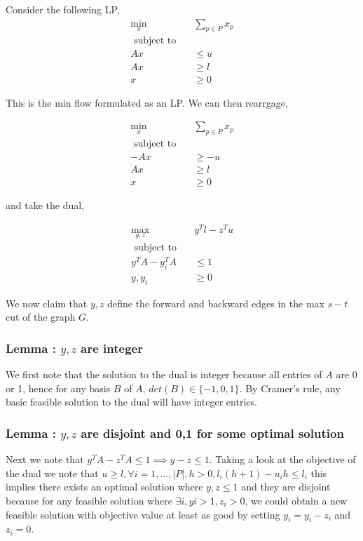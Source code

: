 \documentclass[a4paper]{article}
\begin{document}
Consider the following LP,
\begin{align*}
	\min_x \quad &\sum_{p\in P} x_p\\
	\text{  subject to} \quad\\
	Ax &\leq u\\
	Ax &\geq l\\
	x &\geq 0
\end{align*}

This is the min flow formulated as an LP. We can then rearrgage, 

\begin{align*}
	\min_x \quad &\sum_{p\in P} x_p\\
	\text{  subject to} \quad\\
	-Ax &\geq -u\\
	Ax &\geq l\\
	x &\geq 0
\end{align*}

and take the dual, 

\begin{align*}
	\max_{y, z} \quad & y^Tl - z^Tu\\
	\text{  subject to} \quad\\
	y^TA - y_i^TA &\leq 1\\
	y, y_i &\geq 0
\end{align*}

We now claim that $y, z$ define the forward and backward edges in the max $s-t$ cut
of the graph $G$.
\subsubsection*{Lemma : $y, z$ are integer}
We first note that the solution to the dual is integer because all entries of
$A$ are 0 or 1, hence for any basis $B$ of $A$, $det(B) \in \{-1, 0, 1\}$. 
By Cramer's rule, any basic feasible solution to the dual will have integer entries.

\subsubsection*{Lemma : $y, z$ are disjoint and 0,1 for some optimal solution}
Next we note that $y^TA - z^TA \leq 1 \implies y - z \leq 1$.
Taking a look at the objective of the dual we note that $u \geq l, \forall i = 1,...,|P|, h > 0, l_i(h + 1) - u_ih \leq  l_i$
this implies there exists an optimal solution where $y, z \leq 1$ and they are disjoint because
for any feasible solution where $\exists i, yi > 1, z_i > 0$, we could obtain a new feasible solution 
with objective value at least as good by setting $y_i = y_i - z_i$ and $z_i = 0$.
\end{document}

